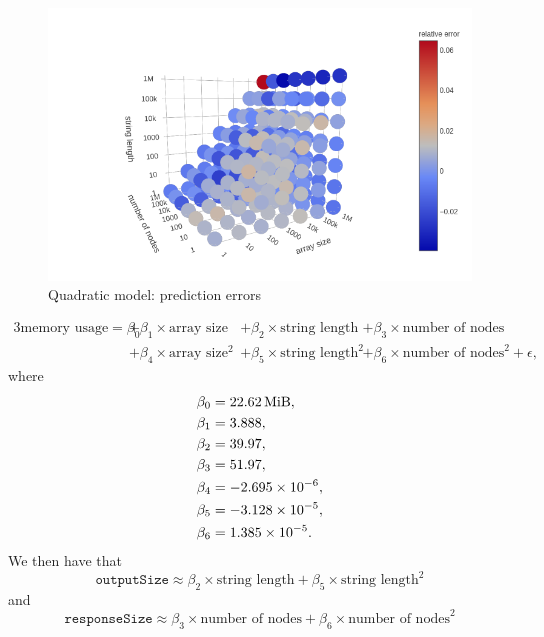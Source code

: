 \documentclass{article}
\begin{document}
\begin{figure}
  \centering
  \includegraphics[width=\textwidth]{../io_local_tests/quadratic_prediction_errors.png}
  \caption{Quadratic model: prediction errors}
\end{figure}

\begin{alignat*}{3}
  \text{memory usage} = \beta_0 &+ \beta_1 \times \text{array size} &&+ \beta_2
  \times \text{string length} & &+ \beta_3 \times \text{number of nodes} \\
  &+ \beta_4 \times \text{array size}^2 &&+ \beta_5 \times \text{string
    length}^2 & &+ \beta_6 \times \text{number of nodes}^2 + \epsilon,
\end{alignat*}
where
\begin{align*}
  \beta_0 &= \SI{22.62}{\mebi\byte}, \\
  \beta_1 &= \num{3.888}, \\
  \beta_2 &= \num{39.97}, \\
  \beta_3 &= \num{51.97}, \\
  \beta_4 &= -\num{2.695e-6}, \\
  \beta_5 &= -\num{3.128e-5}, \\
  \beta_6 &= \num{1.385e-5}.
\end{align*}
We then have that
\[
  \texttt{outputSize} \approx \beta_2 \times \text{string length} + \beta_5
  \times \text{string length}^2
\]
and
\[
  \texttt{responseSize} \approx \beta_3 \times \text{number of nodes} + \beta_6
  \times \text{number of nodes}^2
\]
\end{document}

